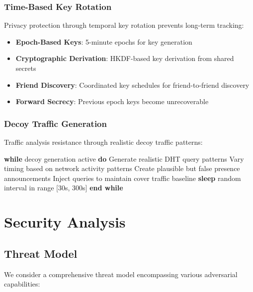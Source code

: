 \documentclass[11pt,a4paper]{article}
\theoremstyle{definition}
\theoremstyle{remark}
\begin{document}
\subsubsection{Time-Based Key Rotation}

Privacy protection through temporal key rotation prevents long-term tracking:

\begin{itemize}
    \item \textbf{Epoch-Based Keys}: 5-minute epochs for key generation
    \item \textbf{Cryptographic Derivation}: HKDF-based key derivation from shared secrets
    \item \textbf{Friend Discovery}: Coordinated key schedules for friend-to-friend discovery
    \item \textbf{Forward Secrecy}: Previous epoch keys become unrecoverable
\end{itemize}

\subsubsection{Decoy Traffic Generation}

Traffic analysis resistance through realistic decoy traffic patterns:

\begin{algorithm}
\caption{Decoy Traffic Generation}
\begin{algorithmic}[1]
\STATE \textbf{while} decoy generation active \textbf{do}
    \STATE Generate realistic DHT query patterns
    \STATE Vary timing based on network activity patterns
    \STATE Create plausible but false presence announcements
    \STATE Inject queries to maintain cover traffic baseline
    \STATE \textbf{sleep} random interval in range [30s, 300s]
\STATE \textbf{end while}
\end{algorithmic}
\end{algorithm}

\section{Security Analysis}

\subsection{Threat Model}

We consider a comprehensive threat model encompassing various adversarial capabilities:
\end{document}
